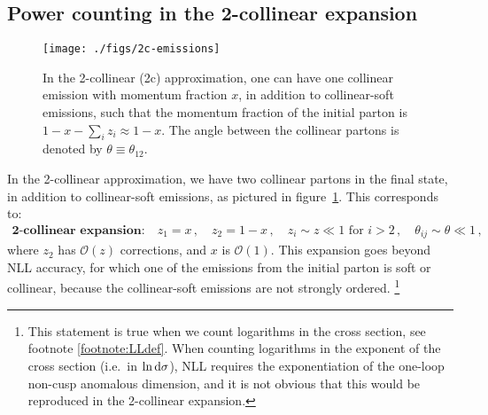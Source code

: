 \documentclass[a4paper,11pt]{article}
\newcommand{\fig}[1]{figure~\ref{fig:#1}}
\begin{document}
\subsection{Power counting in the 2-collinear expansion}

\begin{figure}[t]
\centering
 \texttt{[image: ./figs/2c-emissions]} 
 \caption{In the 2-collinear (2c) approximation, one can have one collinear emission with momentum fraction $x$, in addition to collinear-soft emissions, such that the momentum fraction of the initial parton is $1-x-\sum_i z_i \approx 1-x$.
 The angle between the collinear partons is denoted by $\theta\equiv \theta_{12}$.}
  \label{fig:coll}
 \end{figure}
 
In the 2-collinear approximation, we have two collinear partons in the final state, in addition to collinear-soft emissions, as pictured in \fig{coll}. This corresponds to:
\begin{align} \label{eq:pc2}
 \textbf{2-collinear expansion:} \quad z_1 = x\,, \quad z_2 = 1-x\,, \quad z_i \sim z \ll 1 \text{ for } i>2\,, \quad \theta_{ij} \sim \theta \ll 1 \,,
\end{align}
%
where $z_2$ has $\mathcal{O}(z)$ corrections, and $x$ is $\mathcal{O}(1)$.
%
This expansion goes beyond NLL accuracy, for which one of the emissions from the initial parton is soft or collinear, because the collinear-soft emissions are not strongly ordered.%
%
\footnote{This statement is true when we count logarithms in the cross section, see footnote \ref{footnote:LLdef}. When counting logarithms in the exponent of the cross section (i.e.~in $\ln {\rm d} \sigma$), NLL requires the exponentiation of the one-loop non-cusp anomalous dimension, and it is not obvious that this would be reproduced in the 2-collinear expansion.} 
\end{document}
